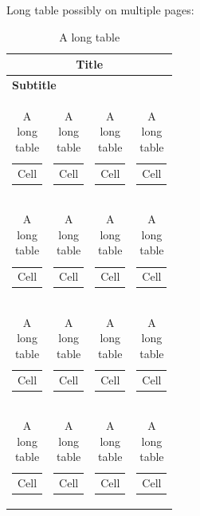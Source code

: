 Long table possibly on multiple pages:

\begin{longtable}{|l|l|l|l|}

\caption{A long table}\label{table:long_table}\\

\hline

\multicolumn{4}{|c|}{{\textbf{Title}}} \\ \hline
\multicolumn{4}{|l|}{\textbf{Subtitle}} \\ \hline

\begin{tabular}[c]{@{}l@{}} Cell \end{tabular} &
\begin{tabular}[c]{@{}l@{}} Cell \end{tabular} &
\begin{tabular}[c]{@{}l@{}} Cell \end{tabular} & 
\begin{tabular}[c]{@{}l@{}} Cell \end{tabular} \\ \hline

\begin{tabular}[c]{@{}l@{}} Cell \end{tabular} &
\begin{tabular}[c]{@{}l@{}} Cell \end{tabular} &
\begin{tabular}[c]{@{}l@{}} Cell \end{tabular} & 
\begin{tabular}[c]{@{}l@{}} Cell \end{tabular} \\ \hline

\begin{tabular}[c]{@{}l@{}} Cell \end{tabular} &
\begin{tabular}[c]{@{}l@{}} Cell \end{tabular} &
\begin{tabular}[c]{@{}l@{}} Cell \end{tabular} & 
\begin{tabular}[c]{@{}l@{}} Cell \end{tabular} \\ \hline

\begin{tabular}[c]{@{}l@{}} Cell \end{tabular} &
\begin{tabular}[c]{@{}l@{}} Cell \end{tabular} &
\begin{tabular}[c]{@{}l@{}} Cell \end{tabular} & 
\begin{tabular}[c]{@{}l@{}} Cell \end{tabular} \\ \hline


\end{longtable}
